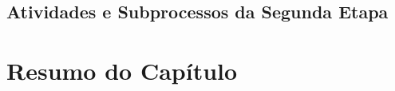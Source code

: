
\subsection{Atividades e Subprocessos da Segunda Etapa}
\label{met-atividades-segunda-etapa}





\section{Resumo do Capítulo}
\label{mtd-resumo}

